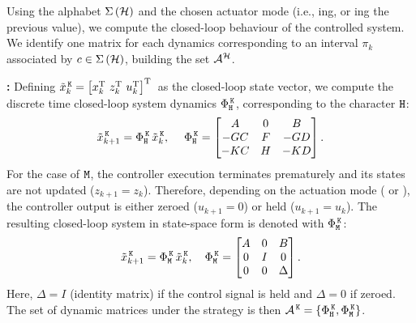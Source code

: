 Using the alphabet $\Sigma\left(\mathcal{H}\right)$ and the chosen actuator mode (i.e., \tZ{}ing, or \tH{}ing the previous value), we compute the closed-loop behaviour of the controlled system.
We identify one matrix for each dynamics corresponding to an interval $\pi_k$ associated by $c \in \Sigma\left( \mathcal{H} \right)$, building the set $\mathcal{A}^{\mathcal{H}}$.

\textbf{\tK{}: }%
%
Defining $\tilde x_k^{\,\texttt{K}} = \left[ x_k^{\mathrm{\small{T}}}{}\,\, z_k^{\mathrm{\small{T}}}{}\,\, u_k^{\mathrm{\small{T}}}{} \right]^{\mathrm{\small{T}}}{}$ as the closed-loop state vector,
we compute the discrete time closed-loop system dynamics $\Phi{}^{\,\texttt{K}}_{\texttt{H}}$, corresponding to the character $\texttt{H}$:
\begin{equation*}
    \tilde x_{k+1}^{\,\texttt{K}} = \Phi{}^{\,\texttt{K}}_{\texttt{H}}\,\tilde x_k^{\,\texttt{K}}, \quad\;
     \Phi{}^{\,\texttt{K}}_{\texttt{H}} = \begin{bmatrix}
        A       & 0    & B       \\
        -GC   & F  & -GD   \\
        -KC   & H  & -KD   \\
    \end{bmatrix}.
\end{equation*}
%
For the case of $\texttt{M}$, the controller execution terminates prematurely and its states are not updated ($z_{k+1} = z_k$).
Therefore, depending on the actuation mode (\tZ{} or \tH{}), the controller output is either zeroed ($u_{k+1} = 0$) or held ($u_{k+1} = u_k$).
The resulting closed-loop system in state-space form is denoted with $\Phi{}^{\,\texttt{K}}_{\texttt{M}}$:
\begin{equation*}
    \tilde x_{k+1}^{\,\texttt{K}} = \Phi{}^{\,\texttt{K}}_{\texttt{M}}\,\tilde x_k^{\,\texttt{K}}, \quad
   \Phi{}^{\,\texttt{K}}_{\texttt{M}} = \begin{bmatrix}
        A & 0  & B \\
        0   & I  & 0   \\
        0   & 0  & \Delta
    \end{bmatrix}.
\end{equation*}
Here, $\Delta = I$ (identity matrix) if the control signal is held and $\Delta = 0$ if zeroed.
The set of dynamic matrices under the \tK{} strategy is then $\mathcal{A}^{\,\texttt{K}}=\left\{\Phi{}^{\,\texttt{K}}_{\texttt{H}},\Phi{}^{\,\texttt{K}}_{\texttt{M}}\right\}$.

